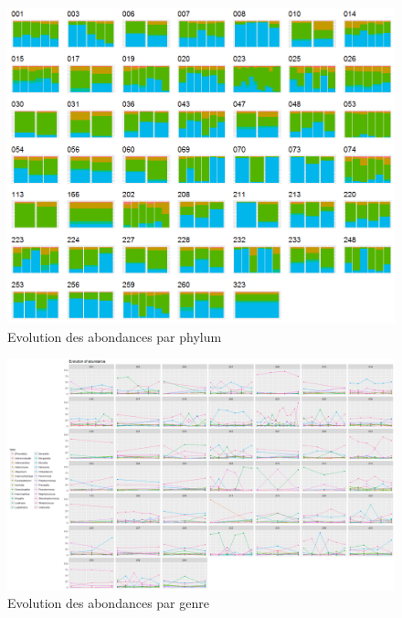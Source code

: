 \documentclass[12pt,a4paper]{article}
\begin{document}
\begin{figure}
\begin{center}
\includegraphics[scale=0.60]{img/enfin_barplot_phylum_norm.png}\hfill
\end{center}
\caption{Evolution des abondances par phylum}
\label{plotabundancephylum}
\end{figure}


\begin{figure}
\begin{center}
\includegraphics[scale=0.40,angle=90]{img/evolution_abundance.png}\hfill
\end{center}
\caption{Evolution des abondances par genre}
\label{plotabundancecurve}
\end{figure}
\end{document}
